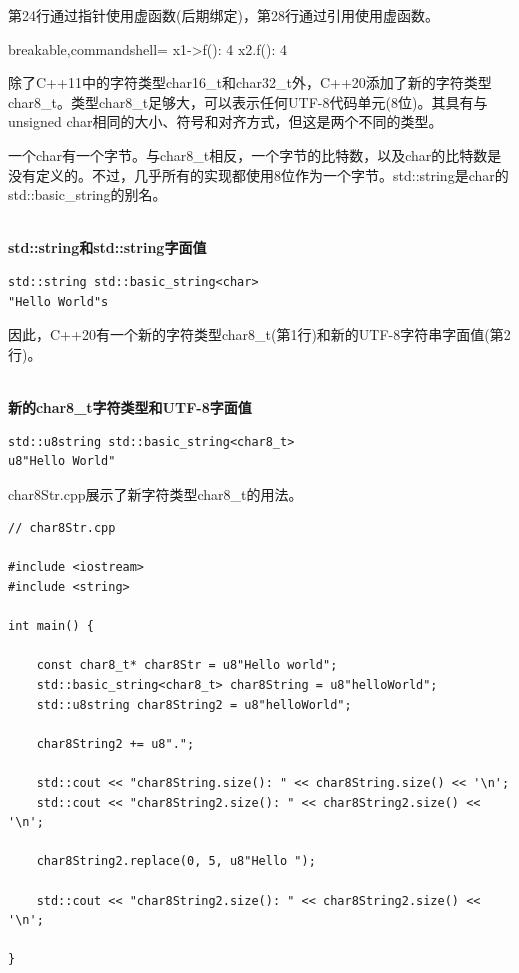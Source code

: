 第24行通过指针使用虚函数(后期绑定)，第28行通过引用使用虚函数。

\begin{tcblisting}{breakable,commandshell={}}
x1->f(): 4
x2.f(): 4
\end{tcblisting}


除了C++11中的字符类型char16\_t和char32\_t外，C++20添加了新的字符类型char8\_t。类型char8\_t足够大，可以表示任何UTF-8代码单元(8位)。其具有与unsigned char相同的大小、符号和对齐方式，但这是两个不同的类型。

\begin{tcolorbox}[breakable,enhanced jigsaw,colback=blue!5!white,colframe=blue!75!black,title={char和char8\_t}]
一个char有一个字节。与char8\_t相反，一个字节的比特数，以及char的比特数是没有定义的。不过，几乎所有的实现都使用8位作为一个字节。std::string是char的std::basic\_string的别名。

\hspace*{\fill} \\ %
\noindent
\textbf{std::string和std::string字面值}
\begin{lstlisting}[style=styleCXX]
std::string std::basic_string<char>
"Hello World"s
\end{lstlisting}
\end{tcolorbox}

因此，C++20有一个新的字符类型char8\_t(第1行)和新的UTF-8字符串字面值(第2行)。

\hspace*{\fill} \\ %
\noindent
\textbf{新的char8\_t字符类型和UTF-8字面值}
\begin{lstlisting}[style=styleCXX]
std::u8string std::basic_string<char8_t>
u8"Hello World"
\end{lstlisting}

char8Str.cpp展示了新字符类型char8\_t的用法。

\begin{lstlisting}[style=styleCXX]
// char8Str.cpp

#include <iostream>
#include <string>

int main() {
	
	const char8_t* char8Str = u8"Hello world";
	std::basic_string<char8_t> char8String = u8"helloWorld";
	std::u8string char8String2 = u8"helloWorld";
	
	char8String2 += u8".";
	
	std::cout << "char8String.size(): " << char8String.size() << '\n';
	std::cout << "char8String2.size(): " << char8String2.size() << '\n';
	
	char8String2.replace(0, 5, u8"Hello ");
	
	std::cout << "char8String2.size(): " << char8String2.size() << '\n';

}
\end{lstlisting}

